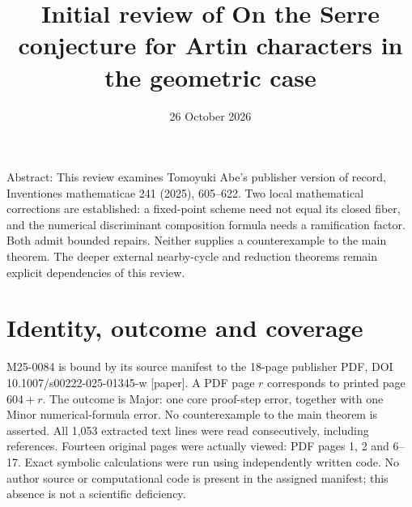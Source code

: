 \documentclass[10pt]{article}
\title{Initial review of
On the Serre conjecture for Artin characters
in the geometric case}
\author{}
\date{26 October 2026}
\begin{document}
\maketitle
Abstract: This review examines Tomoyuki Abe’s publisher version of record, Inventiones mathematicae 241 (2025), 605–622. Two local mathematical corrections are established: a fixed-point scheme need not equal its closed fiber, and the numerical discriminant composition formula needs a ramification factor. Both admit bounded repairs. Neither supplies a counterexample to the main theorem. The deeper external nearby-cycle and reduction theorems remain explicit dependencies of this review.\par
\section*{Identity, outcome and coverage}
M25-0084 is bound by its source manifest to the 18-page publisher PDF, DOI 10.1007/s00222-025-01345-w [paper]. A PDF page \(r\) corresponds to printed page \(604+r\). The outcome is Major: one core proof-step error, together with one Minor numerical-formula error. No counterexample to the main theorem is asserted. All 1,053 extracted text lines were read consecutively, including references. Fourteen original pages were actually viewed: PDF pages 1, 2 and 6–17. Exact symbolic calculations were run using independently written code. No author source or computational code is present in the assigned manifest; this absence is not a scientific deficiency.\par
\end{document}

